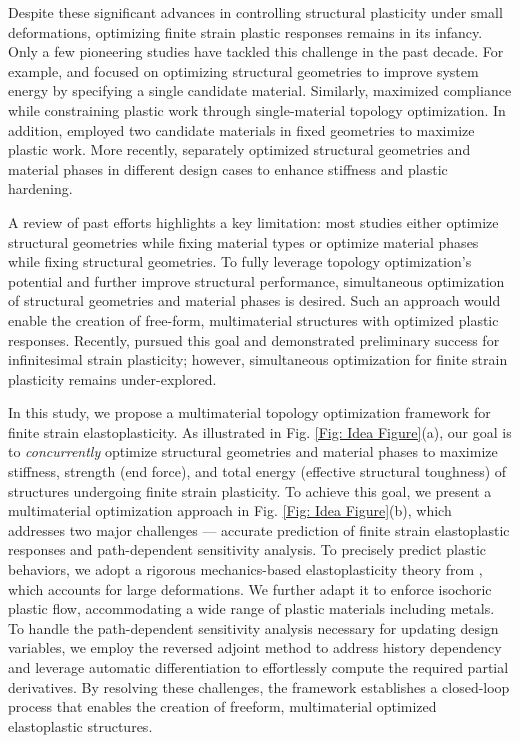 \documentclass[preprint,11pt]{elsarticle}
\theoremstyle{definition}
\begin{document}
Despite these significant advances in controlling structural plasticity under small deformations, optimizing finite strain plastic responses remains in its infancy. Only a few pioneering studies have tackled this challenge in the past decade. For example, \citet{wallin_topology_2016} and \citet{ivarsson_topology_2018, ivarsson_topology_2020} focused on optimizing structural geometries to improve system energy by specifying a single candidate material. Similarly, \citet{ivarsson_plastic_2021} maximized compliance while constraining plastic work through single-material topology optimization. In addition, \citet{alberdi_bi-material_2019} employed two candidate materials in fixed geometries to maximize plastic work. More recently, \citet{han_topology_2024} separately optimized structural geometries and material phases in different design cases to enhance stiffness and plastic hardening.

A review of past efforts highlights a key limitation: most studies either optimize structural geometries while fixing material types or optimize material phases while fixing structural geometries. To fully leverage topology optimization’s potential and further improve structural performance, simultaneous optimization of structural geometries and material phases is desired.
Such an approach would enable the creation of free-form, multimaterial structures with optimized plastic responses. Recently, \citet{jia_multimaterial_2025} pursued this goal and demonstrated preliminary success for infinitesimal strain plasticity; however, simultaneous optimization for finite strain plasticity remains under-explored.

In this study, we propose a multimaterial topology optimization framework for finite strain elastoplasticity. As illustrated in Fig. \ref{Fig: Idea Figure}(a), our goal is to \textit{concurrently} optimize structural geometries and material phases to maximize stiffness, strength (end force), and total energy (effective structural toughness) of structures undergoing finite strain plasticity. To achieve this goal, we present a multimaterial optimization approach in Fig. \ref{Fig: Idea Figure}(b), which addresses two major challenges --- accurate prediction of finite strain elastoplastic responses and path-dependent sensitivity analysis. To precisely predict plastic behaviors, we adopt a rigorous mechanics-based elastoplasticity theory from \citet{simo_framework_1988-1, simo_framework_1988}, which accounts for large deformations. We further adapt it to enforce isochoric plastic flow, accommodating a wide range of plastic materials including metals. To handle the path-dependent sensitivity analysis necessary for updating design variables, we employ the reversed adjoint method \citep{alberdi_unified_2018, jia_multimaterial_2025} to address history dependency and leverage automatic differentiation to effortlessly compute the required partial derivatives. By resolving these challenges, the framework establishes a closed-loop process that enables the creation of freeform, multimaterial optimized elastoplastic structures.
\end{document}
